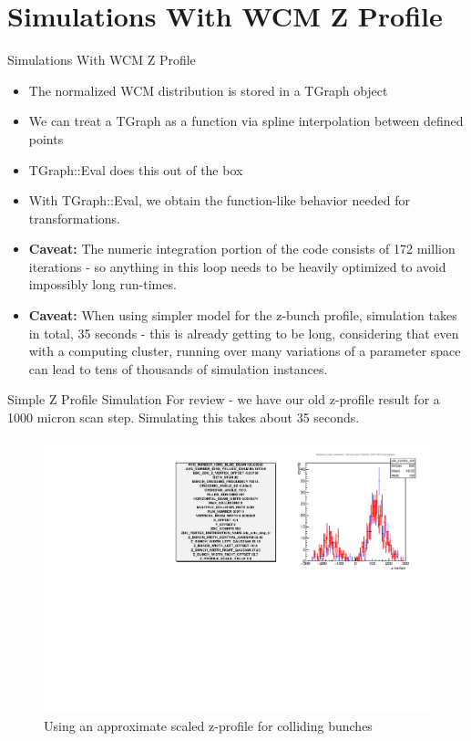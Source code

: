 \section{Simulations With WCM Z Profile}
\label{ch:ZBunchInSimulation}

\begin{frame}{Simulations With WCM Z Profile}
\begin{itemize}
\item The normalized WCM distribution is stored in a TGraph object 
\item We can
	treat a TGraph as a function via spline interpolation between defined
	points 
\item TGraph::Eval does this out of the box 
\item With TGraph::Eval, we obtain the function-like behavior needed for
	transformations.  
\item \textbf{Caveat:} The numeric integration portion of the code consists of
	172 million iterations - so anything in this loop needs to be heavily
	optimized to avoid impossibly long run-times.  
\item \textbf{Caveat:} When using simpler model for the z-bunch profile,
	simulation takes in total, 35 seconds - this is already getting to be
	long, considering that even with a computing cluster, running over many
	variations of a parameter space can lead to tens of thousands of
	simulation instances.
\end{itemize}
\end{frame}

\begin{frame}{Simple Z Profile Simulation}
For review - we have our old z-profile result for a 1000 micron scan step. Simulating this takes about 35 seconds. 
\begin{figure}
\begin{center}
\includegraphics[width=0.75\linewidth]{../ZBunchInSimulation/figs/zvertex_compare_hscan_pos_1000_359711.pdf}
\end{center}
\caption{Using an approximate scaled z-profile for colliding bunches}
\label{fig:zvertex_compare_hscan_pos_1000_359711}
\end{figure}
\end{frame}

